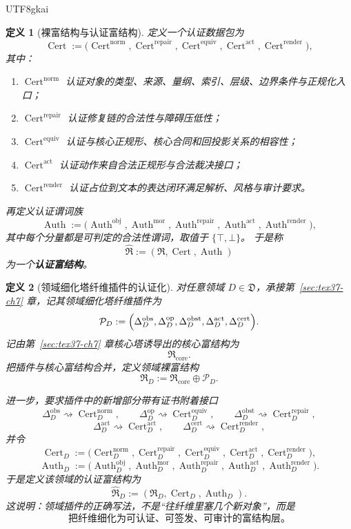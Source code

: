 \documentclass[12pt]{article}
\newtheorem{definition}{定义}[section]
\newcommand{\Cert}{\operatorname{Cert}}
\newcommand{\Auth}{\operatorname{Auth}}
\begin{document}
\begin{CJK*}{UTF8}{gkai}
\begin{definition}[裸富结构与认证富结构]
定义一个认证数据包为
\[
  \Cert
  :=
  \bigl(
    \Cert^{\mathrm{norm}},
    \Cert^{\mathrm{repair}},
    \Cert^{\mathrm{equiv}},
    \Cert^{\mathrm{act}},
    \Cert^{\mathrm{render}}
  \bigr),
\]
其中：
\begin{enumerate}
  \item $\Cert^{\mathrm{norm}}$ 认证对象的类型、来源、量纲、索引、层级、边界条件与正规化入口；
  \item $\Cert^{\mathrm{repair}}$ 认证修复链的合法性与障碍压低性；
  \item $\Cert^{\mathrm{equiv}}$ 认证与核心正规形、核心合同和回投影关系的相容性；
  \item $\Cert^{\mathrm{act}}$ 认证动作来自合法正规形与合法裁决接口；
  \item $\Cert^{\mathrm{render}}$ 认证占位到文本的表达闭环满足解析、风格与审计要求。
\end{enumerate}

再定义认证谓词族
\[
  \Auth
  :=
  \bigl(
    \Auth^{\mathrm{obj}},
    \Auth^{\mathrm{mor}},
    \Auth^{\mathrm{repair}},
    \Auth^{\mathrm{act}},
    \Auth^{\mathrm{render}}
  \bigr),
\]
其中每个分量都是可判定的合法性谓词，取值于 $\{\top,\bot\}$。
于是称
\[
  \widehat{\mathfrak R}
  :=
  (\mathfrak R,\Cert,\Auth)
\]
为一个\textbf{认证富结构}。
\end{definition}

\begin{definition}[领域细化塔纤维插件的认证化]
\label{def:tex37-ch8-plugin-auth}
对任意领域 $D\in\mathfrak D$，承接第~\ref{sec:tex37-ch7} 章，记其领域细化塔纤维插件为
\[
  \mathcal P_D
  :=
  \Bigl(
    \Delta_D^{\mathrm{obs}},
    \Delta_D^{\mathrm{op}},
    \Delta_D^{\mathrm{obst}},
    \Delta_D^{\mathrm{act}},
    \Delta_D^{\mathrm{cert}}
  \Bigr).
\]
记由第~\ref{sec:tex37-ch7} 章核心塔诱导出的核心富结构为
\[
  \mathfrak R_{\mathrm{core}}.
\]
把插件与核心富结构合并，定义领域裸富结构
\[
  \mathfrak R_D
  :=
  \mathfrak R_{\mathrm{core}}
  \oplus
  \mathcal P_D.
\]

进一步，要求插件中的新增部分带有证书附着接口
\[
  \Delta_D^{\mathrm{obs}}\rightsquigarrow \Cert_D^{\mathrm{norm}},
  \qquad
  \Delta_D^{\mathrm{op}}\rightsquigarrow \Cert_D^{\mathrm{equiv}},
  \qquad
  \Delta_D^{\mathrm{obst}}\rightsquigarrow \Cert_D^{\mathrm{repair}},
\]
\[
  \Delta_D^{\mathrm{act}}\rightsquigarrow \Cert_D^{\mathrm{act}},
  \qquad
  \Delta_D^{\mathrm{cert}}\rightsquigarrow \Cert_D^{\mathrm{render}},
\]
并令
\[
  \Cert_D
  :=
  \bigl(
    \Cert_D^{\mathrm{norm}},
    \Cert_D^{\mathrm{repair}},
    \Cert_D^{\mathrm{equiv}},
    \Cert_D^{\mathrm{act}},
    \Cert_D^{\mathrm{render}}
  \bigr),
\]
\[
  \Auth_D
  :=
  \bigl(
    \Auth_D^{\mathrm{obj}},
    \Auth_D^{\mathrm{mor}},
    \Auth_D^{\mathrm{repair}},
    \Auth_D^{\mathrm{act}},
    \Auth_D^{\mathrm{render}}
  \bigr).
\]
于是定义该领域的认证富结构为
\[
  \widehat{\mathfrak R}_D
  :=
  (\mathfrak R_D,\Cert_D,\Auth_D).
\]
这说明：领域插件的正确写法，不是“往纤维里塞几个新对象”，而是
\[
  \boxed{
    \text{把纤维细化为可认证、可签发、可审计的富结构层。}
  }
\]
\end{definition}


\end{CJK*}
\end{document}
